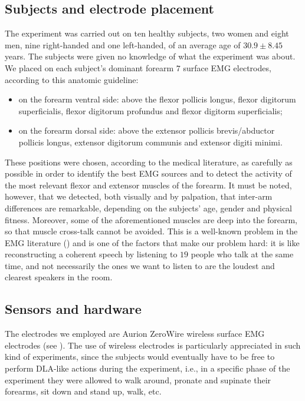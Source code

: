 \subsection{Subjects and electrode placement}

The experiment was carried out on ten healthy subjects, two women and
eight men, nine right-handed and one left-handed, of an average age of
$30.9 \pm 8.45$ years. The subjects were given no knowledge of what
the experiment was about. We placed on each subject's dominant forearm
$7$ surface EMG electrodes, according to this anatomic guideline:

\begin{itemize}

  \item on the forearm ventral side: above the flexor pollicis longus,
    flexor digitorum superficialis, flexor digitorum profundus and
    flexor digitorm superficialis;

  \item on the forearm dorsal side: above the extensor pollicis
    brevis/abductor pollicis longus, extensor digitorum communis and
    extensor digiti minimi.

\end{itemize}

These positions were chosen, according to the medical literature,
as carefully as possible in order to identify the best EMG sources and
to detect the activity of the most relevant flexor and extensor
muscles of the forearm. It must be noted, however, that we detected,
both visually and by palpation, that inter-arm differences are
remarkable, depending on the subjects' age, gender and physical
fitness. Moreover, some of the aforementioned muscles are deep into
the forearm, so that muscle cross-talk cannot be avoided. This is a
well-known problem in the EMG literature (\cite{deluca,zecca}) and is
one of the factors that make our problem hard: it is like
reconstructing a coherent speech by listening to $19$ people who talk
at the same time, and not necessarily the ones we want to listen to
are the loudest and clearest speakers in the room.

\subsection{Sensors and hardware}

The electrodes we employed are Aurion ZeroWire wireless surface EMG
electrodes (see \cite{...}). The use of wireless electrodes is
particularly appreciated in such kind of experiments, since the
subjects would eventually have to be free to perform DLA-like actions
during the experiment, i.e., in a specific phase of the experiment
they were allowed to walk around, pronate and supinate their forearms,
sit down and stand up, walk, etc.

